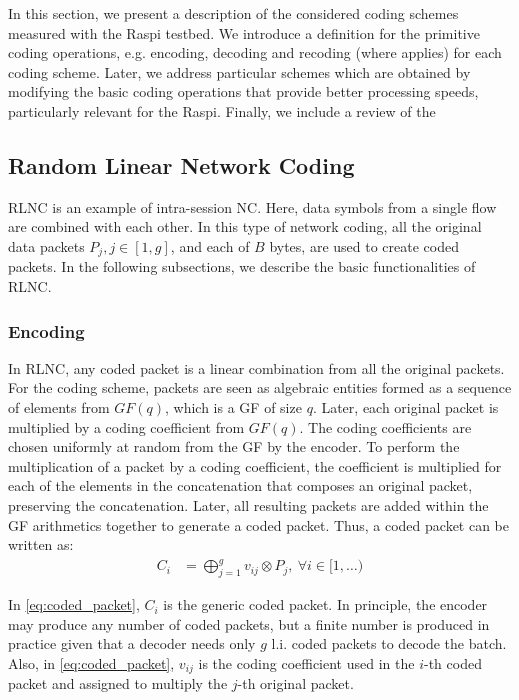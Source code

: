 \label{sec:schemes}

In this section, we present a description of the considered coding schemes
measured with the \ac{Raspi} testbed. We introduce a definition
for the primitive coding operations, e.g. encoding, decoding and recoding
(where applies) for each coding scheme. Later, we address particular schemes
which are obtained by modifying the basic coding operations that provide
better processing speeds, particularly relevant for the \ac{Raspi}.
Finally, we include a review of the 

\subsection{Random Linear Network Coding}
\label{ssec:RLNC}

\ac{RLNC} is an example of intra-session \ac{NC}. Here, data symbols from a
single flow are combined with each other. In this type of network coding, all
the original data packets $P_j, j \in [1,g]$, and each of $B$ bytes, are used to
create coded packets. In the following subsections, we describe the basic
functionalities of \ac{RLNC}.

\subsubsection{Encoding}
In \ac{RLNC}, any coded packet is a linear combination from all
the original packets. For the coding scheme, packets are seen as
algebraic entities formed as a sequence of elements from $GF(q)$,
which is a \ac{GF} of size $q$. Later, each original packet is
multiplied by a coding coefficient from $GF(q)$. The coding coefficients
are chosen uniformly at random from the \ac{GF} by the encoder. To
perform the multiplication of a packet by a coding coefficient, the
coefficient is multiplied for each of the elements in the
concatenation that composes an original packet, preserving the
concatenation. Later, all resulting packets are added within the
\ac{GF} arithmetics together to generate a coded packet. Thus, a
coded packet can be written as:
%
\begin{align} \label{eq:coded_packet}
C_i  &= \bigoplus_{j=1}^{g} v_{ij} \otimes P_j ,\ \forall i \in [1,\ldots)
\end{align}

In \eqref{eq:coded_packet}, $C_i$ is the generic coded packet. In principle,
the encoder may produce any number of coded packets, but a finite
number is produced in practice given that a decoder needs only
$g$ \ac{l.i.} coded packets to decode the batch. Also, in
\eqref{eq:coded_packet}, $v_{ij}$ is the coding coefficient used in the
$i$-th coded packet and assigned to multiply the $j$-th original packet.

